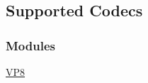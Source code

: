 \hypertarget{group__codecs}{
\subsection{\-Supported \-Codecs}
\label{group__codecs}
}
\subsubsection*{\-Modules}
\begin{DoxyCompactItemize}
\item 
\hyperlink{group__vp8}{\-V\-P8}
\end{DoxyCompactItemize}
